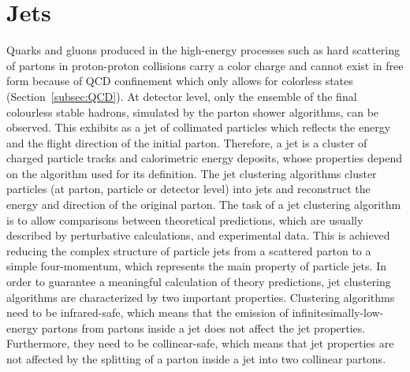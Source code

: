 \section{Jets}\label{sec:jets}

Quarks and gluons produced in the high-energy processes
such as hard scattering of partons in proton-proton collisions carry a color charge and 
cannot exist in free form because of QCD confinement which only allows for colorless states (Section~\ref{subsec:QCD}).
At detector level, only the ensemble of the final colourless stable hadrons, simulated by the parton shower algorithms, can be observed.
This exhibits as a jet of collimated particles which reflects the energy and the flight direction of the initial parton.
Therefore, a jet is a cluster of charged particle tracks and calorimetric energy deposits, whose properties depend on the algorithm used for its definition.
The jet clustering algorithms cluster particles (at parton, particle or detector level) into jets and reconstruct the energy and direction of the original parton. The task of a jet clustering algorithm is to allow comparisons between theoretical predictions, which are usually described by perturbative calculations, and experimental data. This is achieved reducing the complex structure of particle jets from a scattered parton to a simple four-momentum, which represents the main property of particle jets.
In order to guarantee a meaningful calculation of theory predictions, jet clustering algorithms are characterized by two important properties.
Clustering algorithms need to be infrared-safe, which means that the emission of infinitesimally-low-energy partons from partons inside a jet does not affect the jet properties. Furthermore, they need to be collinear-safe, which means that jet properties are not affected by the splitting of a parton inside a jet into two collinear partons.
